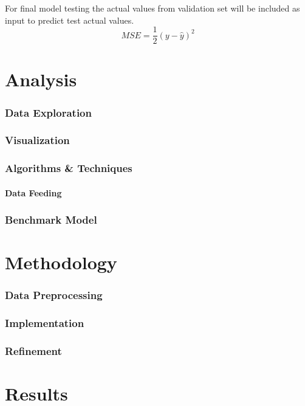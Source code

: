 \documentclass[a4paper,12pt]{article}
\begin{document}
For final model testing the actual values from validation set will be included as input to predict test actual values.
\begin{equation}
	\label{MSE}
	MSE = \frac{1}{2} \left( y - \hat{y} \right)^2
\end{equation}


\part{Analysis}
\section{Data Exploration}
\section{Visualization}
\section{Algorithms \& Techniques}
\subsection{Data Feeding}
\section{Benchmark Model}


\part{Methodology}
\section{Data Preprocessing}
\section{Implementation}
\section{Refinement}


\part{Results}
\end{document}
